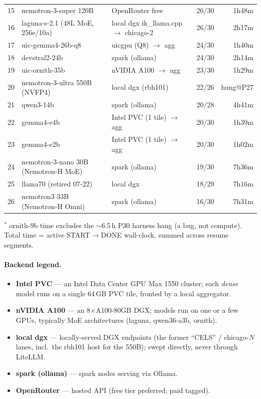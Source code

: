 \documentclass[11pt]{article}
\begin{document}
{\begin{longtable}{@{}rp{4.7cm}p{4.3cm}rr@{}}
15 & nemotron-3-super 120B            & OpenRouter free                    & 26/30       & 1h48m \\
16 & laguna-s-2.1 (48L MoE, 256e/10a) & local dgx ik\_llama.cpp $\to$ chicago-2 & 26/30 & 2h17m \\
17 & uic-gemma4-26b-q8                & uicgpu (Q8) $\to$ agg              & 24/30       & 1h40m \\
18 & devstral2-24b                    & spark (ollama)                     & 24/30       & 2h14m \\
19 & uic-ornith-35b                   & nVIDIA A100 $\to$ agg                   & 23/30       & 1h29m \\
20 & nemotron-3-ultra 550B (NVFP4)    & local dgx (rbh101)                 & 22/26       & hung@P27 \\
21 & qwen3-14b                        & spark (ollama)                     & 20/28       & 4h41m \\
22 & gemma4-e4b                       & Intel PVC (1 tile) $\to$ agg          & 20/30       & 1h39m \\
23 & gemma4-e2b                       & Intel PVC (1 tile) $\to$ agg          & 20/30       & 1h02m \\
24 & nemotron-3-nano 30B (Nemotron-H MoE) & spark (ollama)                & 19/30       & 7h36m \\
25 & llama70 (retired 07-22)          & local dgx                          & 18/29       & 7h16m \\
26 & nemotron3 33B (Nemotron-H Omni)  & spark (ollama)                     & 16/30       & 7h31m \\
\bottomrule
\end{longtable}
}

{\footnotesize $^{*}$ ornith-9b time excludes the $\sim$6.5\,h P30 harness hang (a
bug, not compute). Total time = active START$\to$DONE wall-clock, summed across resume
segments.}

\paragraph{Backend legend.}
\begin{itemize}
\item \textbf{Intel PVC} --- an Intel Data Center GPU Max 1550 cluster; each
  \emph{dense} model runs on a single 64\,GB PVC tile, fronted by a local aggregator.
\item \textbf{nVIDIA A100} --- an 8$\times$A100-80GB DGX; models run on one or a few
  GPUs, typically MoE architectures (laguna, qwen36-a3b, ornith).
\item \textbf{local dgx} --- locally-served DGX endpoints (the former ``CELS'' /
  chicago-$N$ lanes, incl.\ the rbh101 host for the 550B); swept directly, never
  through LiteLLM.
\item \textbf{spark (ollama)} --- spark nodes serving via Ollama.
\item \textbf{OpenRouter} --- hosted API (free tier preferred; paid tagged).
\end{itemize}
\end{document}
